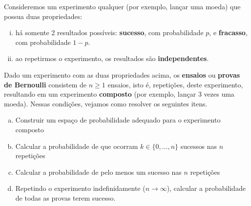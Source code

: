 \documentclass[../Notas.tex]{subfiles}
\begin{document}
\begin{example}
Consideremos um experimento qualquer (por exemplo, lançar uma moeda) que possua duas propriedades:
\begin{enumerate}[(i)]
    \item há somente 2 resultados possíveis: \textbf{sucesso}, com probabilidade $p$, e \textbf{fracasso}, com probabilidade $1-p$.
    \item ao repetirmos o experimento, os resultados são \textbf{independentes}.
\end{enumerate}
Dado um experimento com as duas propriedades acima, os \textbf{ensaios} ou \textbf{provas de Bernoulli} consistem de $n\geq 1$ ensaios, isto é, repetições, deste experimento, resultando em um experimento \textbf{composto} (por exemplo, lançar 3 vezes uma moeda). Nessas condições, vejamos como resolver os seguintes itens.
\begin{enumerate}[(a)]
    \item Construir um espaço de probabilidade adequado para o experimento composto
    \item Calcular a probabilidade de que ocorram $k\in\{0, \dots, n\}$ sucessos nas $n$ repetições
    \item Calcular a probabilidade de pelo menos um sucesso nas $n$ repetições
    \item Repetindo o experimento indefinidamente ($n\to\infty$), calcular a probabilidade de todas as provas terem sucesso.
\end{enumerate}
\end{example}
\end{document}
